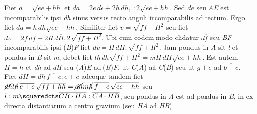 Fiet $a = \sqrt{ee + hh}$ et $d\overline{a} = \overline{2e\,de + 2h\,dh},\ :2\sqrt{ee + hh}$. Sed $d\overline{e}$ seu \textit{AE} est incomparabilis ipsi \textit{dh}
sinus versus recto anguli incomparabilis ad rectum. Ergo fiet $d\overline{a} = h\,dh \sqrt{ee + hh}$. Similiter fiet $v = \sqrt{ff + H^2}$ seu fiet $dv = \overline{2f\,df + 2H\,d\overline{H}} : 2\sqrt{ff + H^2}$. Ubi cum eodem modo elidatur $d\overline{f}$ seu \textit{BF} incomparabilis ipsi (\textit{B})\textit{F} 
fiet $d\overline{v} = H\,d\overline{H} : \sqrt{ff + H^2}$. Jam pondus in \textit{A} sit \textit{l} et pondus in \textit{B} sit \textit{m}, debet
 fiet $lh\,dh\sqrt{ff + H^2} = mH\,dH\sqrt{ee + hh}$. Est autem $H = h$ et \textit{dh} ad \textit{dH} seu (\textit{A})\textit{E} ad (\textit{B})\textit{F}, ut \textit{C}(\textit{A}) ad \textit{C}(\textit{B}) seu ut $\overline{g + e}$ ad $\overline{b - c}$. Fiet $dH = dh\,\overline{f - c}:\overline{e + c}$ adeoque tandem fiet $\cancel{dh}l\cancel{h}\,\overline{e + c}\,\sqrt{ff + hh}=\cancel{dh}m\cancel{h}\,\overline{f - c}\,\sqrt{ee + hh}$ 
seu $l:m \squaredots \overline{CB\cdot HA} : \overline{CA\cdot HB}$, seu
pondus in \textit{A} est ad pondus in \textit{B}, in
ex directa distantiarum a centro gravium
(seu \textit{HA} ad \textit{HB})
